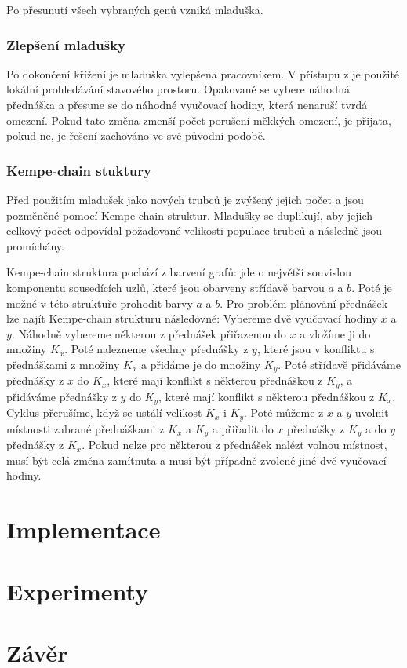 \documentclass[12pt, a4paper]{article}
\begin{document}
Po přesunutí všech vybraných genů vzniká mladuška.
\subsubsection{Zlepšení mladušky}
Po dokončení křížení je mladuška vylepšena pracovníkem.
V přístupu z %
je použité lokální prohledávání stavového prostoru.
Opakovaně se vybere náhodná přednáška a přesune se do náhodné vyučovací hodiny, která nenaruší tvrdá omezení.
Pokud tato změna zmenší počet porušení měkkých omezení, je přijata, pokud ne, je řešení zachováno ve své původní podobě.
\subsubsection{Kempe-chain stuktury}
Před použitím mladušek jako nových trubců je zvýšený jejich počet a jsou pozměněné pomocí Kempe-chain struktur.
Mladušky se duplikují, aby jejich celkový počet odpovídal požadované velikosti populace trubců a následně jsou promíchány.

Kempe-chain struktura %
pochází z barvení grafů: jde o největší souvislou komponentu sousedících uzlů, které jsou obarveny střídavě barvou $a$ a $b$. Poté je možné v této struktuře prohodit barvy $a$ a $b$.
Pro problém plánování přednášek lze najít Kempe-chain strukturu následovně:
Vybereme dvě vyučovací hodiny $x$ a $y$. Náhodně vybereme některou z přednášek přiřazenou do $x$ a vložíme ji do množiny $K_x$. Poté nalezneme všechny přednášky z $y$, které jsou v konfliktu s přednáškami z množiny $K_x$ a přidáme je do množiny $K_y$.
Poté střídavě přidáváme přednášky z $x$ do $K_x$, které mají konflikt s některou přednáškou z $K_y$, a přidáváme přednášky z $y$ do $K_y$, které mají konflikt s některou přednáškou z $K_x$.
Cyklus přerušíme, když se ustálí velikost $K_x$ i $K_y$. Poté můžeme z $x$ a $y$ uvolnit místnosti zabrané přednáškami z $K_x$ a $K_y$ a přiřadit do $x$ přednášky z $K_y$ a do $y$ přednášky z $K_x$.
Pokud nelze pro některou z přednášek nalézt volnou místnost, musí být celá změna zamítnuta a musí být případně zvolené jiné dvě vyučovací hodiny.

\section{Implementace}
\section{Experimenty}
\section{Závěr}
\end{document}
